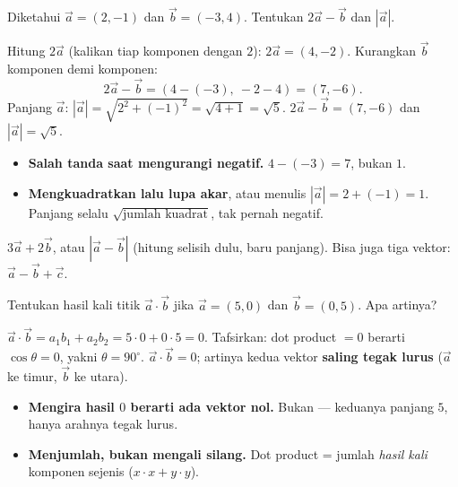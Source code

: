 \begin{soalbox}{}
Diketahui $\vec a=(2,-1)$ dan $\vec b=(-3,4)$. Tentukan $2\vec a-\vec b$ dan
$|\vec a|$.
\end{soalbox}

\jawab
{} Hitung $2\vec a$ (kalikan tiap komponen dengan $2$):
$2\vec a=(4,-2)$.
 Kurangkan $\vec b$ komponen demi komponen:
\[
2\vec a-\vec b=(4-(-3),\ -2-4)=(7,-6).
\]
 Panjang $\vec a$: $|\vec a|=\sqrt{2^2+(-1)^2}=\sqrt{4+1}=\sqrt5$.
\jadi $2\vec a-\vec b=(7,-6)$ dan $|\vec a|=\sqrt5$.

\begin{jebakan}
\begin{itemize}[leftmargin=*,topsep=2pt]
  \item \textbf{Salah tanda saat mengurangi negatif.} $4-(-3)=7$, bukan $1$.
  \item \textbf{Mengkuadratkan lalu lupa akar}, atau menulis $|\vec a|=2+(-1)=1$.
  Panjang selalu $\sqrt{\text{jumlah kuadrat}}$, tak pernah negatif.
\end{itemize}
\end{jebakan}

\begin{variasi}
$3\vec a+2\vec b$, atau $|\vec a-\vec b|$ (hitung selisih dulu, baru panjang).
Bisa juga tiga vektor: $\vec a-\vec b+\vec c$.
\end{variasi}

\begin{soalbox}{}
Tentukan hasil kali titik $\vec a\cdot\vec b$ jika $\vec a=(5,0)$ dan
$\vec b=(0,5)$. Apa artinya?
\end{soalbox}

\jawab
{} $\vec a\cdot\vec b=a_1b_1+a_2b_2=5\cdot0+0\cdot5=0$.
 Tafsirkan: dot product $=0$ berarti $\cos\theta=0$, yakni
$\theta=90^\circ$.
\jadi $\vec a\cdot\vec b=0$; artinya kedua vektor \textbf{saling tegak lurus}
($\vec a$ ke timur, $\vec b$ ke utara).

\begin{jebakan}
\begin{itemize}[leftmargin=*,topsep=2pt]
  \item \textbf{Mengira hasil $0$ berarti ada vektor nol.} Bukan --- keduanya
  panjang $5$, hanya arahnya tegak lurus.
  \item \textbf{Menjumlah, bukan mengali silang.} Dot product = jumlah
  \emph{hasil kali} komponen sejenis ($x{\cdot}x + y{\cdot}y$).
\end{itemize}
\end{jebakan}


